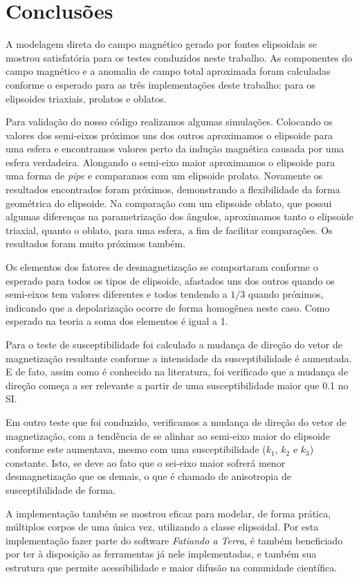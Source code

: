 \chapter{Conclusões}

A modelagem direta do campo magnético gerado por fontes elipsoidais se mostrou satisfatória para os testes conduzidos neste trabalho. As componentes do campo magnético e a anomalia de campo total aproximada foram calculadas conforme o esperado para as três implementações deste trabalho: para os elipsoides triaxiais, prolatos e oblatos.

Para validação do nosso código realizamos algumas simulações. Colocando os valores dos semi-eixos próximos uns dos outros aproximamos o elipsoide para uma esfera e encontramos valores perto da indução magnética causada por uma esfera verdadeira.
Alongando o semi-eixo maior aproximamos o elipsoide para uma forma de \textit{pipe} e comparamos com um elipsoide prolato. Novamente os resultados encontrados foram próximos, demonstrando a flexibilidade da forma geométrica do elipsoide. 
Na comparação com um elipsoide oblato, que possui algumas diferenças na parametrização dos ângulos, aproximamos tanto o elipsoide triaxial, quanto o oblato, para uma esfera, a fim de facilitar comparações. Os resultados foram muito próximos também.

Os elementos dos fatores de desmagnetização se comportaram conforme o esperado para todos os tipos de elipsoide, afastados uns dos outros quando os semi-eixos tem valores diferentes e todos tendendo a $1/3$ quando próximos, indicando que a depolarização ocorre de forma homogênea neste caso. Como esperado na teoria a soma dos elementos é igual a 1.

Para o teste de susceptibilidade foi calculado a mudança de direção do vetor de magnetização resultante conforme a intensidade da susceptibilidade é aumentada. E de fato, assim como é conhecido na literatura, foi verificado que a mudança de direção começa a ser relevante a partir de uma susceptibilidade maior que 0.1 no SI.

Em outro teste que foi conduzido, verificamos a mudança de direção do vetor de magnetização, com a tendência de se alinhar ao semi-eixo maior do elipsoide conforme este aumentava, mesmo com uma susceptibilidade ($k_1$, $k_2$ e $k_3$) constante. Isto, se deve ao fato que o sei-eixo maior sofrerá menor desmagnetização que os demais, o que é chamado de anisotropia de susceptibilidade de forma.

A implementação também se mostrou eficaz para modelar, de forma prática, múltiplos corpos de uma única vez, utilizando a classe elipsoidal. Por esta implementação fazer parte do software \textit{Fatiando a Terra}, é também beneficiado por ter à disposição as ferramentas já nele implementadas, e também sua estrutura que permite acessibilidade e maior difusão na comunidade científica. 

